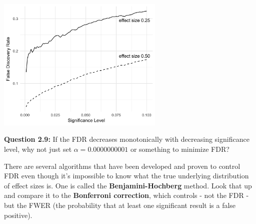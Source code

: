 \begin{center}
\includegraphics[width=0.6\textwidth]{img/multiple-hypothesis-example-1.png}
\end{center}

\begin{mdframed}
\textbf{Question 2.9:} If the FDR decreases monotonically with decreasing significance level, why not just set $\alpha = 0.0000000001$ or something to minimize FDR?
\vspace{20mm}
\end{mdframed}

There are several algorithms that have been developed and proven to control FDR even though it's impossible to know what the true underlying distribution of effect sizes is. One is called the \textbf{Benjamini-Hochberg} method. Look that up and compare it to the \textbf{Bonferroni correction}, which controls - not the FDR - but the FWER (the probability that at least one significant result is a false positive). 
